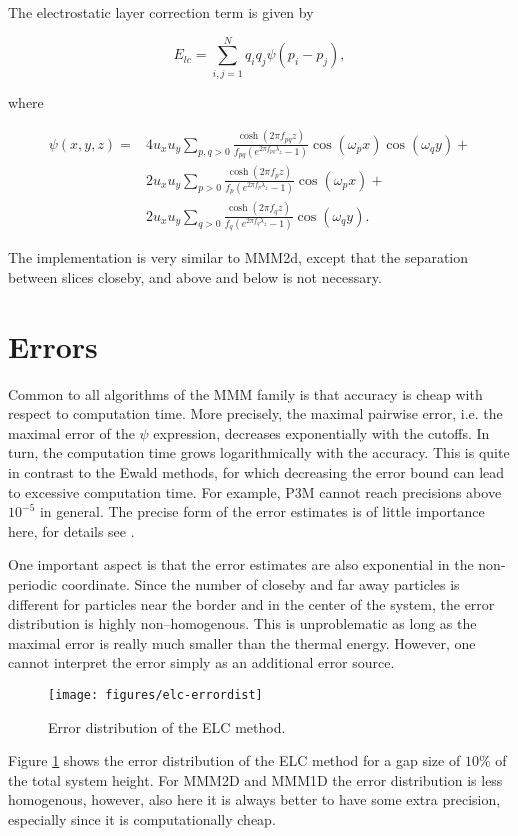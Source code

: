 The electrostatic layer correction term is given by

\[ E_{lc}=\sum_{i,j=1}^Nq_iq_j\psi(p_i-p_j), \]

where

\[ \begin{array}{rl} \psi(x,y,z)=&4u_xu_y\sum_{p,q>0}\frac{\cosh(2\pi
    f_{pq}z)}{f_{pq}(e^{2\pi f_{pq}\lambda_z} - 1)} \cos(\omega_p
  x)\cos(\omega_q y) + \\ &2u_xu_y\sum_{p>0}\frac{\cosh(2\pi f_p
    z)}{f_p(e^{2\pi f_p\lambda_z} - 1)}\cos(\omega_p x)+\\
  &2u_xu_y\sum_{q>0}\frac{\cosh(2\pi f_q z)}{f_q(e^{2\pi f_q\lambda_z}
    - 1)}\cos(\omega_q y). \end{array} \]

The implementation is very similar to MMM2d, except that the
separation between slices closeby, and above and below is not
necessary.

\section{Errors}


Common to all algorithms of the MMM family is that accuracy is cheap
with respect to computation time. More precisely, the maximal pairwise
error, i.e. the maximal error of the $\psi$ expression, decreases
exponentially with the cutoffs. In turn, the computation time grows
logarithmically with the accuracy. This is quite in contrast to the
Ewald methods, for which decreasing the error bound can lead to
excessive computation time. For example, P3M cannot reach precisions
above $10^{-5}$ in general. The precise form of the error estimates is
of little importance here, for details see \citet{arnold02c,arnold02d}.

One important aspect is that the error estimates are also exponential
in the non-periodic coordinate. Since the number of closeby and far
away particles is different for particles near the border and in the
center of the system, the error distribution is highly
non--homogenous. This is unproblematic as long as the maximal error is
really much smaller than the thermal energy. However, one cannot
interpret the error simply as an additional error source.

\begin{figure}[ht]
  \centering
  \texttt{[image: figures/elc-errordist]}
  \caption{Error distribution of the ELC method.}
  \label{fig:ELC-error}
\end{figure}

Figure \ref{fig:ELC-error} shows the error distribution of the ELC
method for a gap size of $10\%$ of the total system height. For MMM2D
and MMM1D the error distribution is less homogenous, however, also
here it is always better to have some extra precision, especially
since it is computationally cheap.



